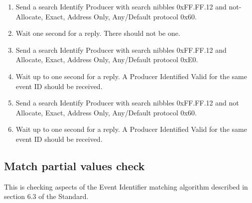 \begin{enumerate}

\item Send a search Identify Producer with search nibbles 0xFF.FF.12 and 
    not-Allocate, Exact, Address Only, Any/Default protocol 0x60.
    
\item Wait one second for a reply.  There should not be one.

\item Send a search Identify Producer with search nibbles 0xFF.FF.12 and 
    Allocate, Exact, Address Only, Any/Default protocol 0xE0.

\item Wait up to one second for a reply.  A Producer Identified Valid for the same event ID
    should be received.

\item Send a search Identify Producer with search nibbles 0xFF.FF.12 and 
    not Allocate, Exact, Address Only, Any/Default protocol 0x60.

\item Wait up to one second for a reply.  A Producer Identified Valid for the same event ID
    should be received.    

\end{enumerate}

\subsection{Match partial values check}

This is checking aspects of the Event Identifier matching algorithm described
in section 6.3 of the Standard.

